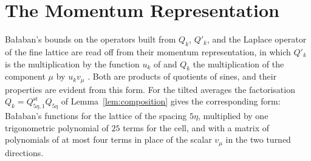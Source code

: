 \documentclass[11pt]{preprint}
\numberwithin{equation}{section}
\theoremstyle{definition}
\theoremstyle{remark}
\theoremstyle{plain}
\begin{document}
\section{The Momentum Representation}\label{sec:momentum}

Ba{\l}aban's bounds on the operators built from $Q_k$, $Q'_k$, and the Laplace operator of the fine lattice are read off from their momentum representation, in which $Q'_k$ is the multiplication by the function $u_k$ of \cite[(1.31), p.~23]{BalabanPRT1} and $Q_k$ the multiplication of the component $\mu$ by $u_kv_\mu$ \cite[(1.61), p.~28]{BalabanPRT1}. Both are products of quotients of sines, and their properties are evident from this form. For the tilted averages the factorisation $Q_k = Q^{\mathrm{st}}_{5\eta,1}Q_{5\eta}$ of Lemma~\ref{lem:composition} gives the corresponding form: Ba{\l}aban's functions for the lattice of the spacing $5\eta$, multiplied by one trigonometric polynomial of $25$ terms for the cell, and with a matrix of polynomials of at most four terms in place of the scalar $v_\mu$ in the two turned directions.
\end{document}
